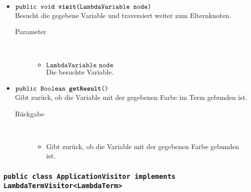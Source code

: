\begin{description}
\begin{itemize}
		\item $\texttt{public void \textbf{visit}(LambdaVariable node)}$ \\ Besucht die gegebene Variable und traversiert weiter zum Elternknoten.
		\begin{description}
			\item[Parameter] \hfill \\
			\vspace{-.8cm}
			\begin{itemize}
				\item $\texttt{LambdaVariable node}$ \\ Die besuchte Variable.
			\end{itemize}
		\end{description}
		
		\item $\texttt{public Boolean \textbf{getResult}()}$ \\ Gibt zurück, ob die Variable mit der gegebenen Farbe im Term gebunden ist.
		\begin{description}
			\item[Rückgabe] \hfill \\
			\vspace{-.8cm}
			\begin{itemize}
				\item Gibt zurück, ob die Variable mit der gegebenen Farbe gebunden ist.
			\end{itemize}
		\end{description}
	\end{itemize}
\end{description}

\subsubsection{\normalfont \texttt{public class \textbf{ApplicationVisitor} implements LambdaTermVisitor<LambdaTerm>}}

